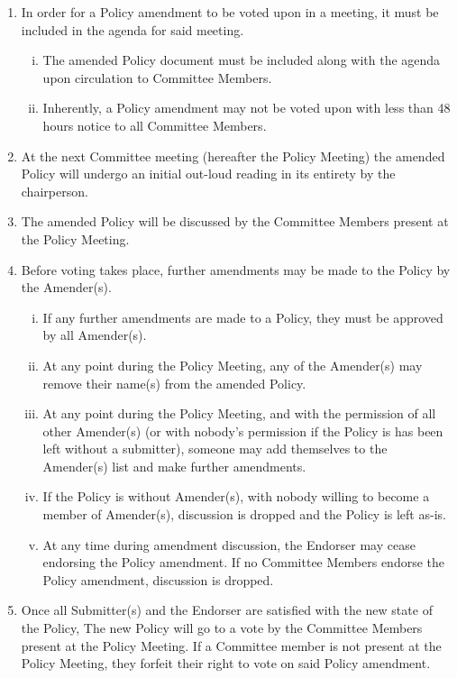 \documentclass[a4paper,12pt]{article}
\begin{document}
\begin{enumerate}[1)]
	\item In order for a Policy amendment to be voted upon in a meeting, it must be included in the agenda for said meeting.
	\begin{enumerate}[i)]
		\item The amended Policy document must be included along with the agenda upon circulation to Committee Members.
		\item Inherently, a Policy amendment may not be voted upon with less than 48 hours notice to all Committee Members.
	\end{enumerate}
	\item At the next Committee meeting (hereafter the Policy Meeting) the amended Policy will undergo an initial out-loud reading in its entirety by the chairperson.
	\item The amended Policy will be discussed by the Committee Members present at the Policy Meeting.
	\item Before voting takes place, further amendments may be made to the Policy by the Amender(s).
	\begin{enumerate}[i)]
		\item If any further amendments are made to a Policy, they must be approved by all Amender(s).
		\item At any point during the Policy Meeting, any of the Amender(s) may remove their name(s) from the amended Policy.
		\item At any point during the Policy Meeting, and with the permission of all other Amender(s) (or with nobody's permission if the Policy is has been left without a submitter), someone may add themselves to the Amender(s) list and make further amendments.
		\item If the Policy is without Amender(s), with nobody willing to become a member of Amender(s), discussion is dropped and the Policy is left as-is.
		\item At any time during amendment discussion, the Endorser may cease endorsing the Policy amendment. If no Committee Members endorse the Policy amendment, discussion is dropped.
	\end{enumerate}
	\item Once all Submitter(s) and the Endorser are satisfied with the new state of the Policy, The new Policy will go to a vote by the Committee Members present at the Policy Meeting. If a Committee member is not present at the Policy Meeting, they forfeit their right to vote on said Policy amendment.

\end{enumerate}
\end{document}

